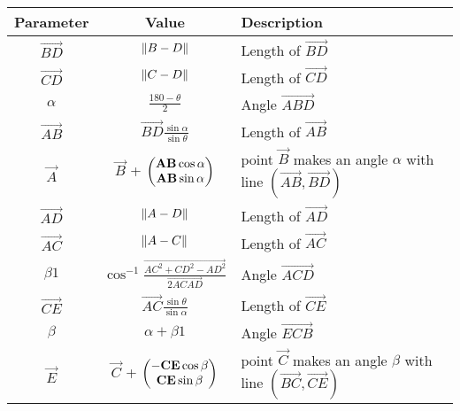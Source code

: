 \begin{tabular}{|c|c|p{5cm}|}
\hline
\textbf{Parameter} & \textbf{Value} & \textbf{Description} \\
\hline
	$\vec{BD}$ & $\left\lVert B-D\right\rVert$ & Length of $\vec{BD}$ \\
\hline
	$\vec{CD}$ & $\left\lVert C-D\right\rVert$ & Length of $\vec{CD}$ \\
\hline
	$\alpha$ & $\frac{180 - \theta}{2}$ & Angle $\vec{ABD}$ \\
\hline
	$\vec{AB}$ & $\vec{BD} \frac{\sin \alpha}{\sin \theta}$ &  Length of $\vec{AB}$ \\
\hline
	$\vec{A}$ & $\vec{B}$ + $\begin{pmatrix}\mathbf{AB} \cos \alpha  \\ \mathbf{AB} \sin \alpha\end{pmatrix}$ & point $\vec{B}$ makes an angle $\alpha$  with line $(\vec{AB} ,\vec{BD})$  \\
\hline
	$\vec{AD}$ & $\left\lVert A-D\right\rVert$ & Length of $\vec{AD}$ \\
\hline
	$\vec{AC}$ & $\left\lVert A-C\right\rVert$ & Length of $\vec{AC}$ \\
\hline
	  
	$\beta 1$ & $\cos^{-1} \frac{\vec{AC^2 +CD^2 - AD^2}}{\vec{2 AC AD}}$ & Angle $\vec{ACD}$ \\
\hline
	$\vec{CE}$ & $\vec{AC} \frac{\sin \theta}{\sin \alpha}$ &  Length of $\vec{CE}$ \\
\hline
	$\beta$ & $\alpha + \beta 1 $ & Angle $\vec{ECB}$\\

\hline
	$\vec{E}$ & $\vec{C}$ + $\begin{pmatrix}\mathbf{-CE} \cos \beta  \\ \mathbf{CE} \sin \beta\end{pmatrix}$ & point $\vec{C}$ makes an angle $\beta$  with line $(\vec{BC} ,\vec{CE})$  \\
\hline

\end{tabular}
